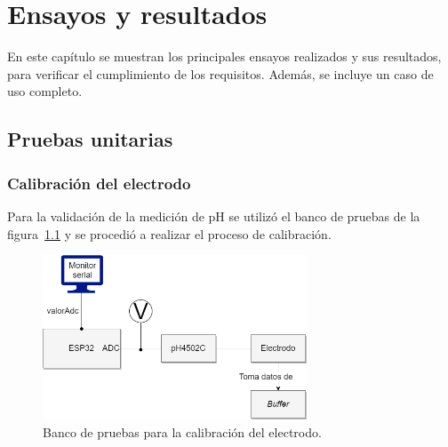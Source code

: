 
\chapter{Ensayos y resultados} %

\label{Chapter4} %

En este capítulo se muestran los principales ensayos realizados y sus resultados, para verificar el cumplimiento de los requisitos. Además, se incluye un caso de uso completo.


\section{Pruebas unitarias}
\label{sec:pruebasUnitarias}

\subsection{Calibración del electrodo}

Para la validación de la medición de pH se utilizó el banco de pruebas de la figura~\ref{fig:bancoPruebasCalibracion} y se procedió a realizar el proceso de calibración.

\begin{figure}[htbp]
	\centering
	\includegraphics[width=0.7\textwidth]{./Figures/bancoPruebasCalibracion.png}
	\caption{Banco de pruebas para la calibración del electrodo.}
	\label{fig:bancoPruebasCalibracion}
\end{figure}

